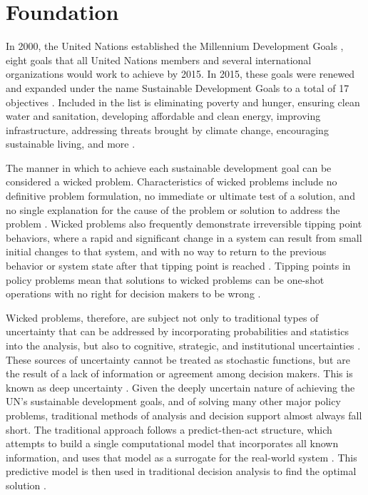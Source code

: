 \renewcommand{\thegapcounter}{\stepcounter{gapcounter} \Nwords{gapcounter}}

\chapter{Foundation}
\label{chapter-intro}

In 2000, the United Nations established the Millennium Development Goals \citep{UnitedNations2015}, eight goals that all United Nations members and several international organizations would work to achieve by 2015. In 2015, these goals were renewed and expanded under the name Sustainable Development Goals to a total of 17 objectives \citep{GAR2015}. Included in the list is eliminating poverty and hunger, ensuring clean water and sanitation, developing affordable and clean energy, improving infrastructure, addressing threats brought by climate change, encouraging sustainable living, and more \citep{GAR2015}. 

The manner in which to achieve each sustainable development goal can be considered a wicked problem. Characteristics of wicked problems include no definitive problem formulation, no immediate or ultimate test of a solution, and no single explanation for the cause of the problem or solution to address the problem \citep{Rittel1973}. Wicked problems also frequently demonstrate irreversible tipping point behaviors, where a rapid and significant change in a system can result from small initial changes to that system, and with no way to return to the previous behavior or system state after that tipping point is reached \citep{Gladwell2006, Lenton2013}. Tipping points in policy problems mean that solutions to wicked problems can be one-shot operations with no right for decision makers to be wrong \citep{Rittel1973}. 

Wicked problems, therefore, are subject not only to traditional types of uncertainty that can be addressed by incorporating probabilities and statistics into the analysis, but also to cognitive, strategic, and institutional uncertainties \citep{Bueren2003}. These sources of uncertainty cannot be treated as stochastic functions, but are the result of a lack of information or agreement among decision makers. This is known as deep uncertainty \citep{WalkerLempertKwakkel2013}. Given the deeply uncertain nature of achieving the UN's sustainable development goals, and of solving many other major policy problems, traditional methods of analysis and decision support almost always fall short. The traditional approach follows a predict-then-act structure, which attempts to build a single computational model that incorporates all known information, and uses that model as a surrogate for the real-world system \citep{Bankes1993}. This predictive model is then used in traditional decision analysis to find the optimal solution \citep{Weaver2013}. 

